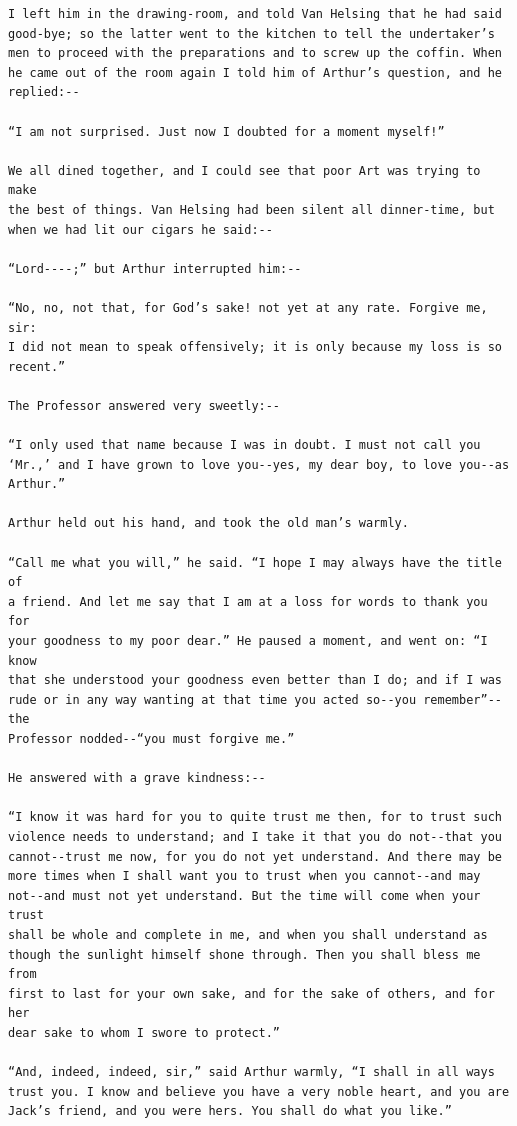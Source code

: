 \documentclass{article}
\begin{document}
\begin{verbatim}
I left him in the drawing-room, and told Van Helsing that he had said
good-bye; so the latter went to the kitchen to tell the undertaker’s
men to proceed with the preparations and to screw up the coffin. When
he came out of the room again I told him of Arthur’s question, and he
replied:--

“I am not surprised. Just now I doubted for a moment myself!”

We all dined together, and I could see that poor Art was trying to make
the best of things. Van Helsing had been silent all dinner-time, but
when we had lit our cigars he said:--

“Lord----;” but Arthur interrupted him:--

“No, no, not that, for God’s sake! not yet at any rate. Forgive me, sir:
I did not mean to speak offensively; it is only because my loss is so
recent.”

The Professor answered very sweetly:--

“I only used that name because I was in doubt. I must not call you
‘Mr.,’ and I have grown to love you--yes, my dear boy, to love you--as
Arthur.”

Arthur held out his hand, and took the old man’s warmly.

“Call me what you will,” he said. “I hope I may always have the title of
a friend. And let me say that I am at a loss for words to thank you for
your goodness to my poor dear.” He paused a moment, and went on: “I know
that she understood your goodness even better than I do; and if I was
rude or in any way wanting at that time you acted so--you remember”--the
Professor nodded--“you must forgive me.”

He answered with a grave kindness:--

“I know it was hard for you to quite trust me then, for to trust such
violence needs to understand; and I take it that you do not--that you
cannot--trust me now, for you do not yet understand. And there may be
more times when I shall want you to trust when you cannot--and may
not--and must not yet understand. But the time will come when your trust
shall be whole and complete in me, and when you shall understand as
though the sunlight himself shone through. Then you shall bless me from
first to last for your own sake, and for the sake of others, and for her
dear sake to whom I swore to protect.”

“And, indeed, indeed, sir,” said Arthur warmly, “I shall in all ways
trust you. I know and believe you have a very noble heart, and you are
Jack’s friend, and you were hers. You shall do what you like.”


\end{verbatim}
\end{document}
